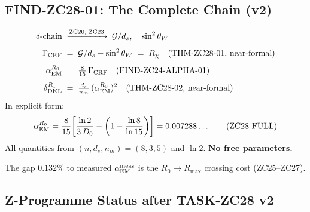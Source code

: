 \documentclass[12pt, a4paper]{article}
\begin{document}
\subsection{FIND-ZC28-01: The Complete Chain (v2)}
\label{zc28:sec:chain}

\begin{keybox}[title={FIND-ZC28-01: Full $\alpha_{\rm EM}$ Chain
  --- Zero Free Parameters (Near-Formal)}]
\begin{align}
  \delta\text{-chain}
  &\;\xrightarrow{\text{ZC20, ZC23}}\;
  \mathcal{G}/d_s,\quad \sin^2\theta_W
  \notag\\[4pt]
  \Gamma_{\rm CRF}
  &\;=\; \mathcal{G}/d_s - \sin^2\theta_W
  \;=\; R_\chi \quad\text{(THM-ZC28-01, near-formal)}
  \notag\\[4pt]
  \alpha_{\rm EM}^{R_0}
  &\;=\; \tfrac{8}{15}\,\Gamma_{\rm CRF}
  \quad\text{(FIND-ZC24-ALPHA-01)}
  \notag\\[4pt]
  \delta_{\rm DKL}^{R_1}
  &\;=\; \tfrac{d_s}{n_m}\,(\alpha_{\rm EM}^{R_0})^2
  \quad\text{(THM-ZC28-02, near-formal)}
  \notag
\end{align}
In explicit form:
\begin{equation}
  \alpha_{\rm EM}^{R_0}
  = \frac{8}{15}\!\left[
    \frac{\ln 2}{3\,D_0}
    - \left(1 - \frac{\ln 8}{\ln 15}\right)
  \right]
  = 0.007288\ldots
  \tag{ZC28-FULL}
\end{equation}
All quantities from $(n, d_s, n_m) = (8, 3, 5)$ and $\ln 2$.
\textbf{No free parameters.}

The gap $0.132\%$ to measured $\alpha_{\rm EM}^{\rm meas}$
is the $R_0\to R_{\max}$ crossing cost (ZC25--ZC27).
\end{keybox}

\subsection{Z-Programme Status after TASK-ZC28 v2}
\label{zc28:sec:status}
\end{document}
